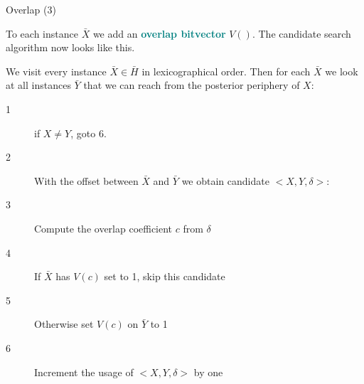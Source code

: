 \documentclass[11pt]{beamer}
\renewcommand{\bold}[1]{\textcolor{teal}{\textbf{#1}}}
\begin{document}
\begin{frame}{Overlap (3)}

To each instance $\bar{X}$ we add an \bold{overlap bitvector} $V()$. The candidate search algorithm now looks like this. \medskip 

We visit every instance $\bar{X}\in\bar{H}$ in lexicographical order. Then for each $\bar{X}$ we look at all instances $\bar{Y}$ that we can reach from the posterior periphery of $X$:

\begin{description}
\item[1] if $X\neq Y$, goto 6.
\item[2] With the offset between $\bar{X}$ and $\bar{Y}$ we obtain candidate $<X,Y,\delta>$:
\item[3] Compute the overlap coefficient $c$ from $\delta$
\item[4] If $\bar{X}$ has $V(c)$ set to 1, skip this candidate
\item[5] Otherwise set $V(c)$ on $\bar{Y}$ to 1 
\item[6] Increment the usage of $<X,Y,\delta>$ by one
\end{description}

\end{frame}

\end{document}
